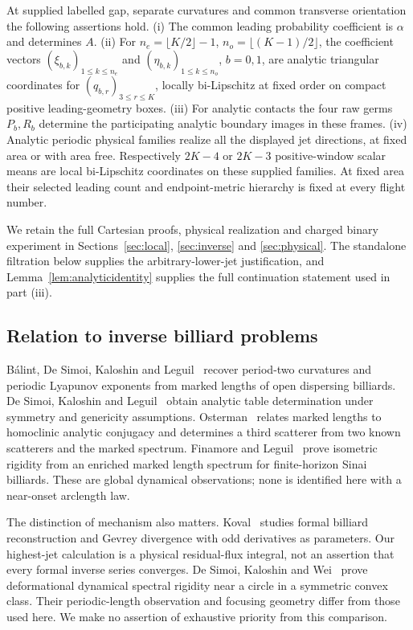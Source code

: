 \begin{theorem}\label{thm:main}
At supplied labelled gap, separate curvatures and common transverse
orientation the following assertions hold.
\textup{(i)} The common leading probability coefficient is $\alpha$ and
determines $A$. \textup{(ii)} For
$n_e=\lfloor K/2\rfloor-1$, $n_o=\lfloor(K-1)/2\rfloor$,
the coefficient vectors $(\xi_{b,k})_{1\le k\le n_e}$ and
$(\eta_{b,k})_{1\le k\le n_o}$, $b=0,1$, are analytic triangular
coordinates for $(q_{b,r})_{3\le r\le K}$, locally bi-Lipschitz at
fixed order on compact positive leading-geometry boxes.
\textup{(iii)} For analytic contacts the four raw germs $P_b,R_b$
determine the participating analytic boundary images in these frames.
\textup{(iv)} Analytic periodic physical families realize all the displayed
jet directions, at fixed area or with area free. Respectively $2K-4$ or
$2K-3$ positive-window scalar means are local bi-Lipschitz coordinates
on these supplied families. At fixed area their selected leading
count and endpoint-metric hierarchy is fixed at every flight number.
\end{theorem}

We retain the full Cartesian proofs, physical realization and charged
binary experiment in Sections~\ref{sec:local}, \ref{sec:inverse} and
\ref{sec:physical}. The standalone filtration below supplies the
arbitrary-lower-jet justification, and Lemma~\ref{lem:analyticidentity}
supplies the full continuation statement used in part (iii).

\subsection{Relation to inverse billiard problems}
B\'alint, De Simoi, Kaloshin and Leguil~\cite{BDKL} recover period-two
curvatures and periodic Lyapunov exponents from marked lengths of open
dispersing billiards. De Simoi, Kaloshin and Leguil~\cite{DSKL} obtain
analytic table determination under symmetry and genericity assumptions.
Osterman~\cite{Osterman} relates marked lengths to homoclinic analytic
conjugacy and determines a third scatterer from two known scatterers and
the marked spectrum. Finamore and Leguil~\cite{FL} prove isometric
rigidity from an enriched marked length spectrum for finite-horizon
Sinai billiards. These are global dynamical observations; none is
identified here with a near-onset arclength law.

The distinction of mechanism also matters. Koval~\cite{Koval} studies
formal billiard reconstruction and Gevrey divergence with odd derivatives
as parameters. Our highest-jet calculation is a physical residual-flux
integral, not an assertion that every formal inverse series converges.
De Simoi, Kaloshin and Wei~\cite{DSKW} prove deformational dynamical
spectral rigidity near a circle in a symmetric convex class. Their
periodic-length observation and focusing geometry differ from those
used here. We make no assertion of exhaustive priority from this
comparison.

